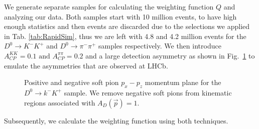 \documentclass{article}
\begin{document}
        We generate separate samples for calculating the weighting function $Q$ and analyzing our data.
        Both samples start with 10 million events, to have high enough statistics and then events are discarded due to the selections we applied in Tab. \ref{tab:RapidSim}, thus we are left with 4.8 and 4.2 million events for the $D^0 \to K^-K^+$ and $D^0 \to \pi^-\pi^+$ samples respectively.
        We then introduce $A_{CP}^{KK} = 0.1 \text{ and } A_{CP}^{\pi\pi} = 0.2$ and a large detection asymmetry as shown in Fig.~\ref{fig:detection} to emulate the asymmetries that are observed at LHCb.
        \begin{figure}[h!]
                \centering
                \caption{Positive and negative soft pion $p_x - p_z$ momentum plane for the $D^0\to k^-K^+$ sample.
                We remove negative soft pions from kinematic regions associated with $A_D(\vec{p}) = 1$.}
                \label{fig:detection}
        \end{figure}
        Subsequently, we calculate the weighting function using both techniques.
\end{document}
